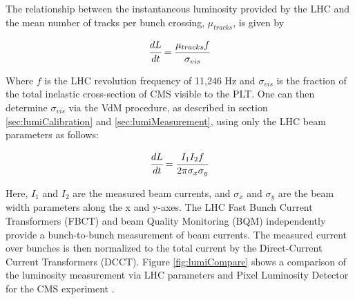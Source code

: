 
The relationship between the instantaneous luminosity provided by the LHC and the mean number of tracks per bunch crossing, $\mu_{tracks}$, is given by


$$\cfrac{dL}{dt} = \cfrac{\mu_{tracks}f} {\sigma_{vis}}$$

\noindent
Where $f$ is the LHC revolution frequency of 11,246 Hz and $\sigma_{vis}$ is the fraction of the total inelastic cross-section of CMS visible to the PLT.  One can then determine $\sigma_{vis}$ via the VdM procedure, as described in section \ref{sec:lumiCalibration} and \ref{sec:lumiMeasurement}, using only the LHC beam parameters as follows:

$$\cfrac{dL}{dt} = \cfrac{I_{1}I_{2}f}{2\pi\sigma_{x}\sigma_{y}}$$

Here, $I_{1}$ and $I_{2}$ are the measured beam currents, and $\sigma_{x}$ and $\sigma_{y}$ are the beam width parameters along the x and y-axes.  The LHC Fast Bunch Current Transformers (FBCT) and beam Quality Monitoring (BQM) independently provide a bunch-to-bunch measurement of beam currents. The measured current over bunches is then normalized to the total current by the Direct-Current Current Transformers (DCCT). Figure \ref{fig:lumiCompare} shows a comparison of the luminosity measurement via LHC parameters and Pixel Luminosity Detector for the CMS experiment \cite{PLT:AN-16-002_v3}.



